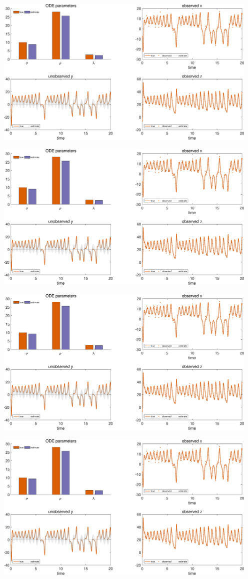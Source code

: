 {\includegraphics [width=5in]{VGM_for_Lorenz_Attractor_10.eps}

\includegraphics [width=5in]{VGM_for_Lorenz_Attractor_11.eps}

\includegraphics [width=5in]{VGM_for_Lorenz_Attractor_12.eps}

\includegraphics [width=5in]{VGM_for_Lorenz_Attractor_13.eps}

}
